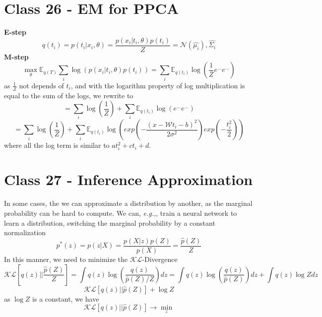 \documentclass{article}
\newcommand{\eg}{\textit{e.g.,}}
\begin{document}
\section{Class 26 - EM for PPCA}
\textbf{E-step}
\begin{equation}
    q(t_i) = p(t_i|x_i, \theta) = \frac{p(x_i|t_i, \theta)p(t_i)}{Z} = \mathcal{N}(\hat{\mu_i}), \hat{\Sigma_i}
\end{equation}
\textbf{M-step}
\begin{equation}
    \max_\theta \mathbb{E}_{q(T)} \sum_i \log\left(p(x_i|t_i, \theta)p(t_i) \right) = \sum_i \mathbb{E}_{q(t_i)} \log\left( \frac{1}{Z}e^{...}e^{...} \right)
\end{equation}
as $\frac{1}{Z}$ not depends of $t_i$, and with the logarithm property of log multiplication is equal to the sum of the logs, we rewrite to
\begin{equation}
    = \sum_i \log(\frac{1}{Z}) + \sum_i \mathbb{E}_{q(t_i)} \log\left(e^{...}e^{...} \right)
\end{equation}
\begin{equation}
    = \sum_i \log(\frac{1}{Z}) + \sum_i \mathbb{E}_{q(t_i)} \log\left(exp\left(-\frac{(x - \mathcal{W}t_i - b)^2}{2\sigma^2}\right) exp\left(-\frac{t_i^2}{2}\right) \right)
\end{equation}
where all the log term is similar to $at_i^2 + ct_i + d$.

\section{Class 27 - Inference Approximation}
In some cases, the we can approximate a distribution by another, as the marginal probability can be hard to compute. We can, \eg, train a neural network to learn a distribution, switching the marginal probability by a constant normalization
\begin{equation}
    p^*(z) = p(z|X) = \frac{p(X|z)p(Z)}{p(X)} = \frac{\hat{p}(Z)}{Z}
\end{equation}
In this manner, we need to minimize the $\mathcal{KL}$-Divergence
\begin{equation}
    \mathcal{KL}[q(z)||\frac{\hat{p}(Z)}{Z}] = \int q(z)\log\left(\frac{q(z)}{\hat{p}(Z)/Z}\right)dz = \int q(z)\log\left(\frac{q(z)}{\hat{p}(Z)}\right)dz + \int q(z) \log Z dz 
\end{equation}
\begin{equation}
    \mathcal{KL}[q(z)||\hat{p}(Z)] + \log Z
\end{equation}
as $\log Z$ is a constant, we have
\begin{equation}
    \mathcal{KL}[q(z)||\hat{p}(Z)] \rightarrow \min_z
\end{equation}
\end{document}
